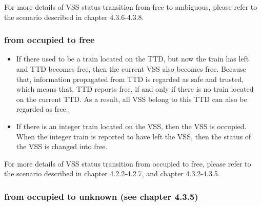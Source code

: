 \documentclass[article,dr=phil,type=msc,colorback,accentcolor=tud9c]{tudthesis}
\begin{document}
  For more details of VSS status transition from free to ambiguous, please refer to the scenario described in chapter 4.3.6-4.3.8.		

  \subsubsection{from occupied to free}

  \begin{itemize}
	
	\item 
	
	If there used to be a train located on the TTD, but now the train has left and TTD becomes free, then the current VSS also becomes free. Because that, information propagated from TTD is regarded as safe and trusted, which means that, TTD reports free, if and only if there is no train located on the current TTD. As a result, all VSS belong to this TTD can also be regarded as free.
	
	\item 
	
	If there is an integer train located on the VSS, then the VSS is occupied. When the integer train is reported to have left the VSS, then the status of the VSS is changed into free.
	
  \end{itemize}

  For more details of VSS status transition from occupied to free, please refer to the scenario described in chapter 4.2.2-4.2.7, and chapter 4.3.2-4.3.5.  

  \subsubsection{from occupied to unknown (see chapter 4.3.5)}
\end{document}
